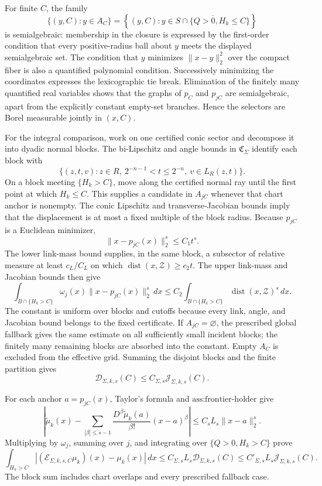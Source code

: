 For finite \(C\), the family
\[
\{(y,C):y\in A_C\}
=\left\{(y,C):y\in\overline{S\cap\{Q>0,H_k\le C\}}\right\}
\]
is semialgebraic: membership in the closure is expressed by the first-order condition that every positive-radius ball about \(y\) meets the displayed semialgebraic set. The condition that \(y\) minimizes \(\|x-y\|_2^2\) over the compact fiber is also a quantified polynomial condition. Successively minimizing the coordinates expresses the lexicographic tie break. Elimination of the finitely many quantified real variables shows that the graphs of \(p_C\) and \(p_{jC}\) are semialgebraic, apart from the explicitly constant empty-set branches. Hence the selectors are Borel measurable jointly in \((x,C)\).

For the integral comparison, work on one certified conic sector and decompose it into dyadic normal blocks. The bi-Lipschitz and angle bounds in \(\mathfrak C_\Sigma\) identify each block with
\[
\{(z,t,v):z\in R,\ 2^{-n-1}<t\le2^{-n},\ v\in L_R(z,t)\}.
\]
On a block meeting \(\{H_k>C\}\), move along the certified normal ray until the first point at which \(H_k\le C\). This supplies a candidate in \(A_{jC}\) whenever that chart anchor is nonempty. The conic Lipschitz and transverse-Jacobian bounds imply that the displacement is at most a fixed multiple of the block radius. Because \(p_{jC}\) is a Euclidean minimizer,
\[
\|x-p_{jC}(x)\|_2^s\le C_1t^s.
\]
The lower link-mass bound supplies, in the same block, a subsector of relative measure at least \(c_L/C_L\) on which \(\operatorname{dist}(x,\mathcal Z)\ge c_2t\). The upper link-mass and Jacobian bounds then give
\[
\int_{B\cap\{H_k>C\}}\omega_j(x)\|x-p_{jC}(x)\|_2^s\,dx
\le C_2\int_{B\cap\{H_k>C\}}\operatorname{dist}(x,\mathcal Z)^s\,dx.
\]
The constant is uniform over blocks and cutoffs because every link, angle, and Jacobian bound belongs to the fixed certificate. If \(A_{jC}=\varnothing\), the prescribed global fallback gives the same estimate on all sufficiently small incident blocks; the finitely many remaining blocks are absorbed into the constant. Empty \(A_C\) is excluded from the effective grid. Summing the disjoint blocks and the finite partition gives
\[
\mathcal D_{\Sigma,k,s}(C)\le C_{\Sigma,s}\mathcal J_{\Sigma,k,s}(C).
\]

For each anchor \(a=p_{jC}(x)\), Taylor's formula and \(\text{ass:frontier-holder}\) give
\[
\left|\widetilde\mu_k(x)-
\sum_{|\beta|\le s-1}
\frac{D^\beta\widetilde\mu_k(a)}{\beta!}(x-a)^\beta\right|
\le C_sL_s\|x-a\|_2^s.
\]
Multiplying by \(\omega_j\), summing over \(j\), and integrating over \(\{Q>0,H_k>C\}\) prove
\[
\int_{H_k>C}|(\mathcal E_{\Sigma,k,s,C}\mu_k)(x)-\mu_k(x)|\,dx
\le C_{\Sigma,s}L_s\mathcal D_{\Sigma,k,s}(C)
\le C'_{\Sigma,s}L_s\mathcal J_{\Sigma,k,s}(C).
\]
The block sum includes chart overlaps and every prescribed fallback case.